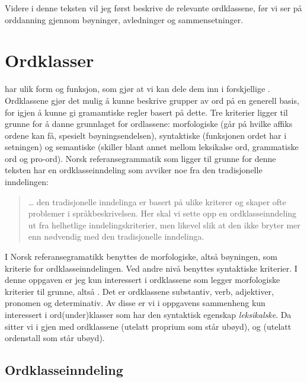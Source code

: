 Videre i denne teksten vil jeg først beskrive de relevante ordklassene, før vi ser på orddanning gjennom bøyninger, avledninger og sammensetninger.

\clearpage
\section{Ordklasser}
\label{sec:ordklasser}

 har ulik form og funksjon, som gjør at vi kan dele dem inn i forskjellige . Ordklassene gjør det mulig å kunne beskrive grupper av ord på en generell basis, for igjen å kunne gi gramamtiske regler basert på dette. Tre kriterier ligger til grunne for å danne grunnlaget for ordlassene: morfologiske (går på hvilke affiks ordene kan få, spesielt bøyningsendelsen), syntaktiske (funksjonen ordet har i setningen) og semantiske (skiller blant annet mellom leksikalse ord, grammatiske ord og pro-ord). Norsk referansegrammatik som ligger til grunne for denne teksten har en ordklasseinndeling som avviker noe fra den tradisjonelle inndelingen\cite{faarlund1997norsk}:

\begin{quote}
… den tradisjonelle inndelinga er basert på ulike kriterer og skaper ofte problemer i språkbeskrivelsen. Her skal vi sette opp en ordklasseinndeling ut fra helhetlige inndelingskriterier, men likevel slik at den ikke bryter mer enn nødvendig med den tradisjonelle inndelinga.
\end{quote}

I Norsk referansegramatikk benyttes de morfologiske, altså bøyningen,  som kriterie for ordklasseinndelingen. Ved andre nivå benyttes syntaktiske kriterier. I denne oppgaven er jeg kun interessert i ordklassene som legger morfologiske kriterier til grunne, altså . Det er ordklassene substantiv, verb, adjektiver, pronomen og determinativ.  Av disse er vi i oppgavens sammenheng kun interessert i ord(under)klasser som har den syntaktisk egenskap \textit{leksikalske}. Da sitter vi i gjen med ordklassene  (utelatt proprium som står ubøyd),  og  (utelatt ordenstall som står ubøyd).

\subsection{Ordklasseinndeling}

